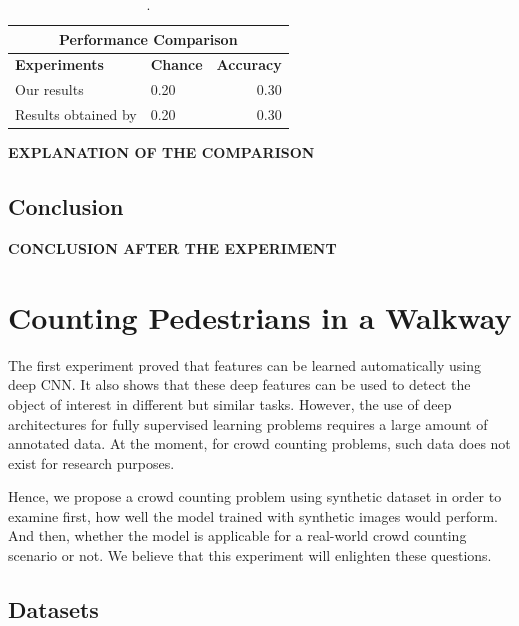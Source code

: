\begin{table}[H]
\centering
\small\sffamily
\begin{tabular}{llr}
\multicolumn{3}{c}{\textbf{\textbf{Performance Comparison}}} \\
\bottomrule
\textbf{Experiments}  & \textbf{Chance} & \textbf{Accuracy} \\
\bottomrule
Our results           & 0.20 & 0.30 \\
Results obtained by \citeauthor*{segui2015learning}       & 0.20 & 0.30 \\

\bottomrule
\end{tabular}
\caption{.}
\label{tab:comp}
\end{table} 

\textbf{EXPLANATION OF THE COMPARISON}

\subsection{Conclusion}

\textbf{CONCLUSION AFTER THE EXPERIMENT} 

\section{Counting Pedestrians in a Walkway}

The first experiment proved that features can be learned automatically using deep CNN. It also shows that these deep features can be used to detect the object of interest in different but similar tasks. However, the use of deep architectures for fully supervised learning problems requires a large amount of annotated data. At the moment, for crowd counting problems, such data does not exist for research purposes. 

Hence, we propose a crowd counting problem using synthetic dataset in order to examine first, how well the model trained with synthetic images would perform. And then, whether the model is applicable for a real-world crowd counting scenario or not. We believe that this experiment will enlighten these questions. 

\subsection{Datasets} 

